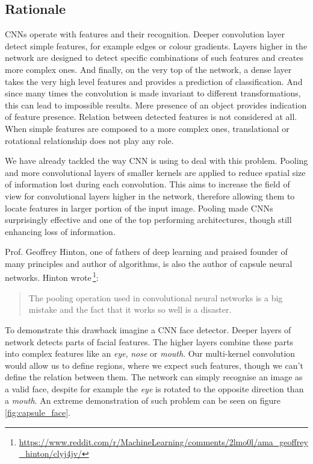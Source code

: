 \subsection{Rationale}

CNNs operate with features and their recognition. Deeper convolution layer detect simple features, for example edges or colour gradients. Layers higher in the network are designed to detect specific combinations of such features and creates more complex ones. And finally, on the very top of the network, a dense layer takes the very high level features and provides a prediction of classification. And since many times the convolution is made invariant to different transformations, this can lead to impossible results. Mere presence of an object provides indication of feature presence. Relation between detected features is not considered at all. When simple features are composed to a more complex ones, translational or rotational relationship does not play any role.

We have already tackled the way CNN is using to deal with this problem. Pooling and more convolutional layers of smaller kernels are applied to reduce spatial size of information lost during each convolution. This aims to increase the field of view for convolutional layers higher in the network, therefore allowing them to locate features in larger portion of the input image. Pooling made CNNs surprisingly effective and one of the top performing architectures, though still enhancing loss of information.

Prof. Geoffrey Hinton, one of fathers of deep learning and praised founder of many principles and author of algorithms, is also the author of capsule neural networks. Hinton wrote\,\footnote{\url{https://www.reddit.com/r/MachineLearning/comments/2lmo0l/ama_geoffrey_hinton/clyj4jv/}}:
\begin{quotation}
    The pooling operation used in convolutional neural networks is a big mistake and the fact that it works so well is a disaster.
\end{quotation}

To demonstrate this drawback imagine a CNN face detector. Deeper layers of network detects parts of facial features. The higher layers combine these parts into complex features like an \textit{eye}, \textit{nose} or \textit{mouth}. Our multi-kernel convolution would allow us to define regions, where we expect such features, though we can't define the relation between them. The network can simply recognise an image as a valid face, despite for example the \textit{eye} is rotated to the opposite direction than a \textit{mouth}. An extreme demonstration of such problem can be seen on figure\,\ref{fig:capsule_face}.

